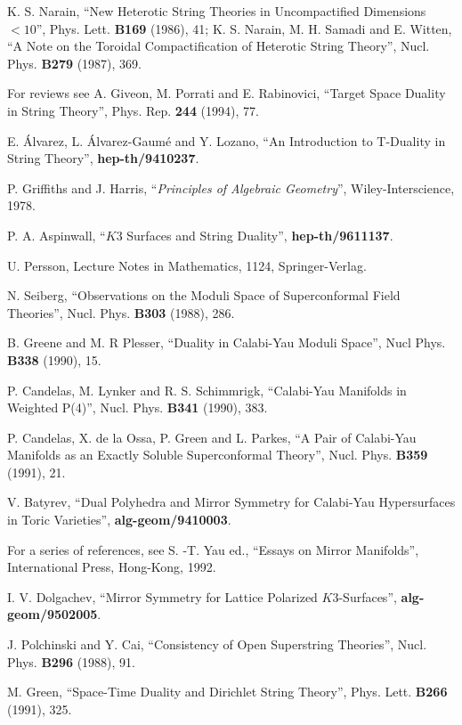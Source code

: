 \begin{thebibliography}{99}
 K. S. Narain, ``New Heterotic String Theories in
Uncompactified Dimensions $<10$'', Phys. Lett. {\bf B169} (1986),
41; K. S. Narain, M. H. Samadi and E. Witten, 
``A Note on the Toroidal Compactification of Heterotic String
Theory'', Nucl. Phys. {\bf B279} (1987), 369.

 For reviews see A. Giveon, M. Porrati and E. Rabinovici, ``Target Space 
Duality in String Theory'', Phys. Rep.
{\bf 244} (1994), 77.

E. \'{A}lvarez, L. \'{A}lvarez-Gaum\'{e} and Y. Lozano, ``An Introduction 
to T-Duality in String Theory'', {\bf hep-th/9410237}.

 P. Griffiths and J. Harris, ``{\em Principles of 
Algebraic Geometry}'', Wiley-Interscience, 1978.

 P. A. Aspinwall, ``$K3$ Surfaces and String
Duality'', {\bf hep-th/9611137}.

 U. Persson, Lecture Notes in Mathematics, 1124,
Springer-Verlag.

 N. Seiberg, ``Observations on the Moduli Space of Superconformal Field 
Theories'', Nucl. Phys. {\bf B303} (1988), 286.

 B. Greene and M. R Plesser, ``Duality in Calabi-Yau 
Moduli Space'', Nucl Phys. {\bf B338} (1990), 15.
  
P. Candelas, M. Lynker and R. S. Schimmrigk, ``Calabi-Yau 
Manifolds in Weighted P(4)'', Nucl. Phys. {\bf B341} (1990), 383.  
  
P. Candelas, X. de la Ossa, P. Green and L. Parkes, ``A Pair of 
Calabi-Yau Manifolds as an Exactly Soluble Superconformal 
Theory'', Nucl. Phys. {\bf B359} (1991), 21.
  
V. Batyrev, ``Dual Polyhedra and Mirror Symmetry for Calabi-Yau
Hypersurfaces in Toric Varieties'', {\bf alg-geom/9410003}.
  
For a series of references, see S. -T. Yau ed., ``Essays on
Mirror Manifolds'', International Press, Hong-Kong, 1992.

 I. V. Dolgachev, ``Mirror Symmetry for Lattice Polarized 
$K3$-Surfaces'', {\bf alg-geom/9502005}.

 J. Polchinski and Y. Cai, ``Consistency of Open
Superstring Theories'', Nucl. Phys. {\bf B296} (1988), 91.
  

M. Green, ``Space-Time Duality and Dirichlet String 
Theory'',  Phys. Lett. {\bf B266} (1991), 325.
  

\end{thebibliography}
